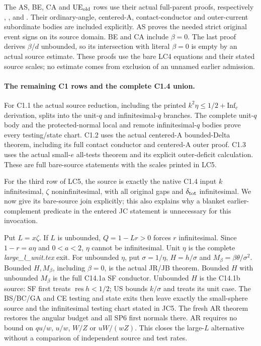 The AS, BE, CA and \({\rm UE}_{\rm old}\) rows use their actual
full-parent proofs, respectively
,
,
 and
.
Their ordinary-angle, centered-A, contact-conductor and
outer-current subordinate bodies are included explicitly.
AS proves the needed strict original event signs on its source
domain.  BE and CA include \(\beta=0\).
The last proof derives \(\beta/d\) unbounded, so its intersection
with literal \(\beta=0\) is empty by an actual source estimate.
These proofs use the bare LC4 equations and their stated source
scales; no estimate comes from exclusion of an unnamed earlier
admission.

\paragraph{The remaining C1 rows and the complete C1.4 union.}
For C1.1 the actual source reduction, including the printed
\(k^2\eta\leq1/2+\mathrm{Inf}_c\) derivation, splits into
the unit-\(q\) and infinitesimal-\(q\) branches.  The complete
unit-\(q\) body and the protected-normal local and remote
infinitesimal-\(q\) bodies prove every testing/state chart.
C1.2 uses the actual centered-A bounded-Delta theorem, including
its full contact conductor and centered-A outer proof.
C1.3 uses the actual small-\(e\) all-tests theorem and its
explicit outer-deficit calculation.  These are full bare-source
statements with the scales printed in LC5.

For the third row of LC5, the source is exactly the native
C1.4 input \(k\) infinitesimal, \(\zeta\) noninfinitesimal,
with all original gaps and \(\delta_{\rm tot}\) infinitesimal.
We now give its bare-source join explicitly; this also explains
why a blanket earlier-complement predicate in the entered JC
statement is unnecessary for this invocation.

Put \(L=x\zeta\).  If \(L\) is unbounded, \(Q=1-Lr>0\)
forces \(r\) infinitesimal.  Since \(1-r=a\eta\) and
\(0<a<2\), \(\eta\) cannot be infinitesimal.
Unit \(\eta\) is the complete \emph{large\_l\_unit.tex}
exit.  For unbounded \(\eta\), put
\(\sigma=1/\eta\), \(H=h/\sigma\) and
\(M_\beta=\beta\theta/\sigma^2\).
Bounded \(H,M_\beta\), including \(\beta=0\), is the actual
JR/JB theorem.  Bounded \(H\) with unbounded \(M_\beta\)
is the full C14.1a SF conductor.  Unbounded \(H\) is
the C14.1b source: SF first treats \(\operatorname{res}h<1/2\);
US bounds \(k/\sigma\) and treats its unit case.
The BS/BC/GA and CE testing and state exits then leave
exactly the small-sphere source and the infinitesimal
testing chart stated in JC5.  The fresh AR theorem restores
the angular budget and all SP6 first normals there.
AR requires no bound on \(qu/w\), \(u/w\), \(W/Z\) or
\(uW/(wZ)\).  This closes the large-\(L\) alternative
without a comparison of independent source and test rates.

